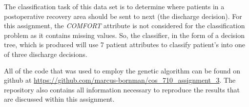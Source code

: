 The classification task of this data set is to determine where patients in a postoperative recovery area should be sent to next (the discharge decision). For this assignment, the \emph{COMFORT} attribute is not considered for the classification problem as it contains missing values. So, the classifier, in the form of a decision tree, which is produced will use 7 patient attributes to classify patient's into one of three discharge decisions.

All of the code that was used to employ the genetic algorithm can be found on github at \url{https://github.com/marcus-bornman/cos_710_assignment_3}. The repository also contains all information necessary to reproduce the results that are discussed within this assignment.
